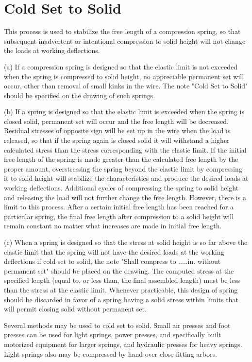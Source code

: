 \documentclass[10pt]{article}
\begin{document}
\section{Cold Set to Solid} %
This process is used to stabilize the free length of a compression spring, so that subsequent inadvertent or intentional compression to solid height will not change the loads at working deflections.

(a) If a compression spring is designed so that the elastic limit is not exceeded when the spring is compressed to solid height, no appreciable permanent set will occur, other than removal of small kinks in the wire. 
The note "Cold Set to Solid" should be specified on the drawing of such springs.

(b) If a spring is designed so that the elastic limit is exceeded when the spring is closed solid, permanent set will occur and the free length will be decreased.
Residual stresses of opposite sign will be set up in the wire when the load is released, so that if the spring again is closed solid it will withstand a higher calculated stress than the stress corresponding with the elastic limit.
If the initial free length of the spring is made greater than the calculated free length by the proper amount, overstressing the spring beyond the elastic limit by compressing it to solid height will stabilize the characteristics and produce the desired loads at working deflections. 
Additional cycles of compressing the spring to solid height and releasing the load will not further change the free length. 
However, there is a limit to this process. 
After a certain initial free length has been reached for a particular spring, the final free length after compression to a solid height will remain constant no matter what increases are made in initial free length.

(c) When a spring is designed so that the stress at solid height is so far above the elastic limit that the spring will not have the desired loads at the working deflections if cold
set to solid, the note "Shall compress to .....in. without permanent set" should be placed on the drawing. 
The computed stress at the specified length (equal to, or less than, the final assembled length) must be less than the stress at the elastic limit. 
Whenever practicable, this design of spring should be discarded in favor of a spring having a solid stress within limits that will permit closing solid without permanent set.

Several methods may be used to cold set to solid. 
Small air presses and foot presses can be used for light springs, power presses, and specifically built motorized equipment for larger springs, and hydraulic presses for
heavy springs. 
Light springs also may be compressed by hand over close fitting arbors.
\end{document}
